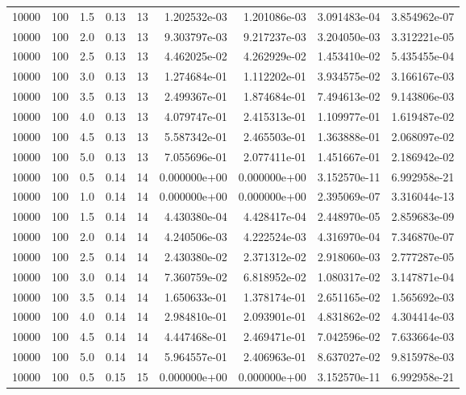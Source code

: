 \begin{tabular}{rrrrrrrrr}
 10000 &  100 &  1.5 &  0.13 &    13 &  1.202532e-03 &  1.201086e-03 &  3.091483e-04 &  3.854962e-07 \\
 10000 &  100 &  2.0 &  0.13 &    13 &  9.303797e-03 &  9.217237e-03 &  3.204050e-03 &  3.312221e-05 \\
 10000 &  100 &  2.5 &  0.13 &    13 &  4.462025e-02 &  4.262929e-02 &  1.453410e-02 &  5.435455e-04 \\
 10000 &  100 &  3.0 &  0.13 &    13 &  1.274684e-01 &  1.112202e-01 &  3.934575e-02 &  3.166167e-03 \\
 10000 &  100 &  3.5 &  0.13 &    13 &  2.499367e-01 &  1.874684e-01 &  7.494613e-02 &  9.143806e-03 \\
 10000 &  100 &  4.0 &  0.13 &    13 &  4.079747e-01 &  2.415313e-01 &  1.109977e-01 &  1.619487e-02 \\
 10000 &  100 &  4.5 &  0.13 &    13 &  5.587342e-01 &  2.465503e-01 &  1.363888e-01 &  2.068097e-02 \\
 10000 &  100 &  5.0 &  0.13 &    13 &  7.055696e-01 &  2.077411e-01 &  1.451667e-01 &  2.186942e-02 \\
 10000 &  100 &  0.5 &  0.14 &    14 &  0.000000e+00 &  0.000000e+00 &  3.152570e-11 &  6.992958e-21 \\
 10000 &  100 &  1.0 &  0.14 &    14 &  0.000000e+00 &  0.000000e+00 &  2.395069e-07 &  3.316044e-13 \\
 10000 &  100 &  1.5 &  0.14 &    14 &  4.430380e-04 &  4.428417e-04 &  2.448970e-05 &  2.859683e-09 \\
 10000 &  100 &  2.0 &  0.14 &    14 &  4.240506e-03 &  4.222524e-03 &  4.316970e-04 &  7.346870e-07 \\
 10000 &  100 &  2.5 &  0.14 &    14 &  2.430380e-02 &  2.371312e-02 &  2.918060e-03 &  2.777287e-05 \\
 10000 &  100 &  3.0 &  0.14 &    14 &  7.360759e-02 &  6.818952e-02 &  1.080317e-02 &  3.147871e-04 \\
 10000 &  100 &  3.5 &  0.14 &    14 &  1.650633e-01 &  1.378174e-01 &  2.651165e-02 &  1.565692e-03 \\
 10000 &  100 &  4.0 &  0.14 &    14 &  2.984810e-01 &  2.093901e-01 &  4.831862e-02 &  4.304414e-03 \\
 10000 &  100 &  4.5 &  0.14 &    14 &  4.447468e-01 &  2.469471e-01 &  7.042596e-02 &  7.633664e-03 \\
 10000 &  100 &  5.0 &  0.14 &    14 &  5.964557e-01 &  2.406963e-01 &  8.637027e-02 &  9.815978e-03 \\
 10000 &  100 &  0.5 &  0.15 &    15 &  0.000000e+00 &  0.000000e+00 &  3.152570e-11 &  6.992958e-21 \\

\end{tabular}
